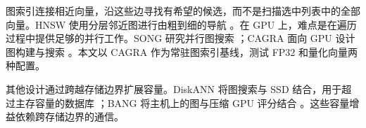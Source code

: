图索引连接相近向量，沿这些边寻找有希望的候选，而不是扫描选中列表中的全部向量。HNSW 使用分层邻近图进行由粗到细的导航 \cite{hnsw}。在 GPU 上，难点是在遍历过程中提供足够的并行工作。SONG 研究并行图搜索 \cite{song}；CAGRA 面向 GPU 设计图构建与搜索 \cite{cagra}。本文以 CAGRA 作为常驻图索引基线，测试 FP32 和量化向量两种配置。

其他设计通过跨越存储边界扩展容量。DiskANN 将图搜索与 SSD 结合，用于超过主存容量的数据库 \cite{diskann}；BANG 将主机上的图与压缩 GPU 评分结合 \cite{bang}。这些容量增益依赖跨存储边界的通信。
